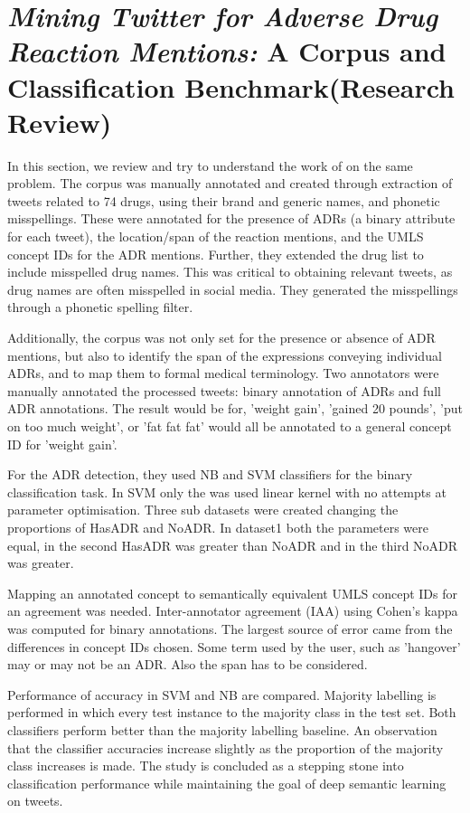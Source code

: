 \section{{\itshape Mining Twitter for Adverse Drug Reaction Mentions:} A Corpus and Classification Benchmark(Research Review)}

In this section, we review and try to understand the work of {\citet{gmctw14}} on the same problem. The corpus was manually annotated and created through extraction of tweets related to 74 drugs, using their brand and generic names, and phonetic misspellings. These were annotated for the presence of ADRs (a binary attribute for each tweet), the location/span of the reaction mentions, and the UMLS concept IDs for the ADR mentions. Further, they extended the drug list to include misspelled drug names. This was critical to obtaining relevant tweets, as drug names are often misspelled in social media. They generated the misspellings through a phonetic spelling filter.

Additionally, the corpus was not only set for the presence or absence of ADR mentions, but also to identify the span of the expressions conveying individual ADRs, and to map them to formal medical terminology. Two annotators were manually annotated the processed tweets: binary annotation of ADRs and full ADR annotations. The result would be for, 'weight gain', 'gained 20 pounds', 'put on too much weight', or 'fat fat fat' would all be annotated to a general concept ID for 'weight gain'. 

For the ADR detection, they used NB and SVM classifiers for the binary classification task. In SVM only the was used linear kernel with no attempts at parameter optimisation. Three sub datasets were created changing the proportions of HasADR and NoADR. In dataset1 both the parameters were equal, in the second HasADR was greater than NoADR and in the third NoADR was greater. 

Mapping an annotated concept to semantically equivalent UMLS concept IDs for an agreement was needed. Inter-annotator agreement (IAA) using Cohen's kappa was computed for binary annotations. The largest source of error came from the differences in concept IDs chosen. Some term used by the user, such as 'hangover' may or may not be an ADR. Also the span has to be considered.

Performance of accuracy in SVM and NB are compared. Majority labelling is performed in which every test instance to the majority class in the test set. Both classifiers perform better than the majority labelling baseline. An observation that the classifier accuracies increase slightly as the proportion of the majority class increases is made. The study is concluded as a stepping stone into classification performance while maintaining the goal of deep semantic learning on tweets. 


